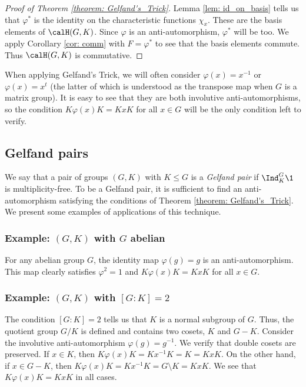 \documentclass[11pt]{amsart}
\theoremstyle{remark}
\begin{document}
\begin{proof}[Proof of Theorem \ref{theorem: Gelfand's_Trick}]
	Lemma \ref{lem: id_on_basis} tells us that $\varphi^\ast$ is the identity on the characteristic functions $\chi_x$.
	These are the basis elements of $\calH(G,K)$.
	Since $\varphi$ is an anti-automorphism, $\varphi^\ast$ will be too.
	We apply Corollary \ref{cor: comm} with $F=\varphi^\ast$ to see that the basis elements commute.
	Thus $\calH(G,K)$ is commutative.
\end{proof}
When applying Gelfand's Trick, we will often consider $\varphi(x)=x^{-1}$ or $\varphi(x)=x^t$ (the latter of which is understood as the transpose map when $G$ is a matrix group).
It is easy to see that they are both involutive anti-automorphisms, so the condition $K\varphi(x)K=KxK$ for all $x\in G$ will be the only condition left to verify.


\subsection{Gelfand pairs}\label{Section1.8}
We say that a pair of groups $(G,K)$ with $K\leq G$ is a \emph{Gelfand pair} if $\Ind_K^G \1$ is multiplicity-free.
To be a Gelfand pair, it is sufficient to find an anti-automorphism satisfying the conditions of Theorem \ref{theorem: Gelfand's_Trick}.
We present some examples of applications of this technique.

\subsubsection{Example: $(G,K)$ with $G$ abelian}
For any abelian group $G$, the identity map $\varphi(g)=g$ is an anti-automorphism.
This map clearly satisfies $\varphi^2=1$ and $K\varphi(x)K=KxK$ for all $x\in G$.

\subsubsection{Example: $(G,K)$ with $[G\! :\! K]=2$}
The condition $[G\! :\! K]=2$ tells us that $K$ is a normal subgroup of $G$.
Thus, the quotient group $G/K$ is defined and contains two cosets, $K$ and $G- K$.
Consider the involutive anti-automorphism $\varphi(g)=g^{-1}$.
We verify that double cosets are preserved.
If $x\in K$, then $K\varphi(x)K = Kx^{-1}K = K = KxK$.
On the other hand, if $x\in G- K$, then $K\varphi(x)K = Kx^{-1}K = G\setminus K = KxK$.
We see that $K\varphi(x)K=KxK$ in all cases.
\end{document}
